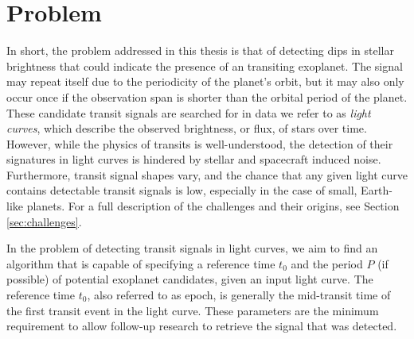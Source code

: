
\section{Problem}

In short, the problem addressed in this thesis is that of detecting dips in stellar brightness that could indicate the presence of an transiting exoplanet. The signal may repeat itself due to the periodicity of the planet's orbit, but it may also only occur once if the observation span is shorter than the orbital period of the planet. These candidate transit signals are searched for in data we refer to as \textit{light curves}, which describe the observed brightness, or flux, of stars over time.  However, while the physics of transits is well-understood, the detection of their signatures in light curves is hindered by stellar and spacecraft induced noise. Furthermore, transit signal shapes vary, and the chance that any given light curve contains detectable transit signals is low, especially in the case of small, Earth-like planets. For a full description of the challenges and their origins, see Section \ref{sec:challenges}. 

In the problem of detecting transit signals in light curves, we aim to find an algorithm that is capable of specifying a reference time $t_0$ and the period $P$ (if possible) of potential exoplanet candidates, given an input light curve. The reference time $t_0$, also referred to as epoch, is generally the mid-transit time of the first transit event in the light curve. These parameters are the minimum requirement to allow follow-up research to retrieve the signal that was detected.